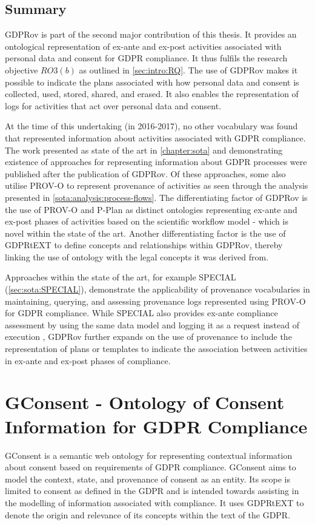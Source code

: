 \subsection*{Summary}
GDPRov is part of the second major contribution of this thesis. It provides an ontological representation of ex-ante and ex-post activities associated with personal data and consent for GDPR compliance.
It thus fulfils the research objective $RO3(b)$ as outlined in \autoref{sec:intro:RQ}. 
The use of GDPRov makes it possible to indicate the plans associated with how personal data and consent is collected, used, stored, shared, and erased.
It also enables the representation of logs for activities that act over personal data and consent.

At the time of this undertaking (in 2016-2017), no other vocabulary was found that represented information about activities associated with GDPR compliance.
The work presented as state of the art in \autoref{chapter:sota} and demonstrating existence of approaches for representing information about GDPR processes were published after the publication of GDPRov. Of these approaches, some also utilise PROV-O to represent provenance of activities as seen through the analysis presented in \autoref{sota:analysis:process-flows}. The differentiating factor of GDPRov is the use of PROV-O and P-Plan as distinct ontologies representing ex-ante and ex-post phases of activities based on the scientific workflow model - which is novel within the state of the art. Another differentiating factor is the use of GDPRtEXT to define concepts and relationships within GDPRov, thereby linking the use of ontology with the legal concepts it was derived from.

Approaches within the state of the art, for example SPECIAL (\autoref{sec:sota:SPECIAL}), demonstrate the applicability of provenance vocabularies in maintaining, querying, and assessing provenance logs represented using PROV-O for GDPR compliance.
While SPECIAL also provides ex-ante compliance assessment by using the same data model and logging it as a request instead of execution \cite{dullaert_d3.4_2019}, GDPRov further expands on the use of provenance to include the representation of plans or templates to indicate the association between activities in ex-ante and ex-post phases of compliance.

\section{GConsent - Ontology of Consent Information for GDPR Compliance}\label{sec:voc:GConsent}
GConsent is a semantic web ontology for representing contextual information about consent based on requirements of GDPR compliance. 
GConsent aims to model the context, state, and provenance of consent as an entity.
Its scope is limited to consent as defined in the GDPR and is intended towards assisting in the modelling of information associated with compliance.
It uses GDPRtEXT to denote the origin and relevance of its concepts within the text of the GDPR.

